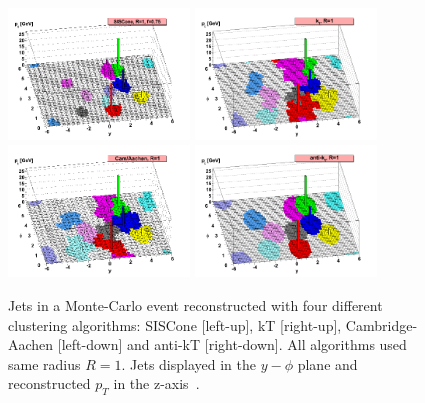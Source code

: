\begin{figure}[!Hhtbp]
  \begin{center}
    \includegraphics[width=0.43\textwidth]{figs/herwig-parton-level-ev-siscone-R1-0-f0-75-ghosted4root.png}
    \includegraphics[width=0.43\textwidth]{figs/herwig-parton-level-ev-kt-R1-0-ghosted4root.png}
    \includegraphics[width=0.43\textwidth]{figs/herwig-parton-level-ev-cam-R1-0-ghosted4root.png}
    \includegraphics[width=0.43\textwidth]{figs/herwig-parton-level-ev-antikt-R1-0-ghosted4root.png}
    \caption{Jets in a Monte-Carlo event reconstructed with four different clustering algorithms: SISCone [left-up], kT [right-up], Cambridge-Aachen [left-down] and anti-kT [right-down]. All algorithms used same radius $R=1$. Jets displayed in the $y-\phi$ plane and reconstructed $p_{T}$ in the z-axis~\cite{Cacciari:2008gp}.}
    \label{fig:JetsAlgos}
  \end{center}
\end{figure}

